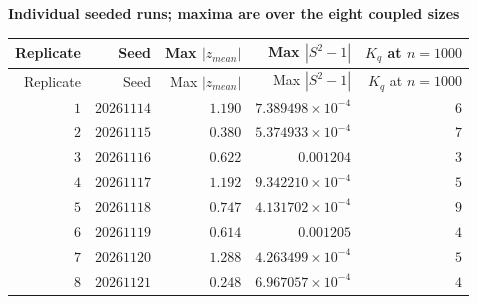 
\begingroup\small
\setlength{\tabcolsep}{4pt}
\noindent\textbf{Individual seeded runs; maxima are over the eight coupled sizes}
\begin{longtable}{rrrrr}
\toprule
Replicate & Seed & Max $|z_{mean}|$ & Max $|S^2-1|$ & $K_q$ at $n=1000$ \\
\midrule
\endfirsthead
Replicate & Seed & Max $|z_{mean}|$ & Max $|S^2-1|$ & $K_q$ at $n=1000$ \\
\midrule
\endhead
\bottomrule
\endfoot
$1$ & $20261114$ & $1.190$ & $7.389498\times10^{-4}$ & $6$ \\
$2$ & $20261115$ & $0.380$ & $5.374933\times10^{-4}$ & $7$ \\
$3$ & $20261116$ & $0.622$ & $0.001204$ & $3$ \\
$4$ & $20261117$ & $1.192$ & $9.342210\times10^{-4}$ & $5$ \\
$5$ & $20261118$ & $0.747$ & $4.131702\times10^{-4}$ & $9$ \\
$6$ & $20261119$ & $0.614$ & $0.001205$ & $4$ \\
$7$ & $20261120$ & $1.288$ & $4.263499\times10^{-4}$ & $5$ \\
$8$ & $20261121$ & $0.248$ & $6.967057\times10^{-4}$ & $4$ \\
\end{longtable}
\endgroup
